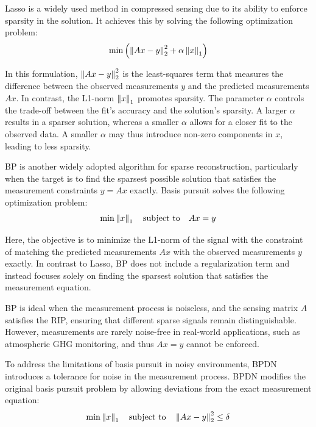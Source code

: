 \gls{Lasso} is a widely used method in compressed sensing due to its ability to enforce sparsity in the solution.
It achieves this by solving the following optimization problem:
\begin{equation}
    \min{\left( \left\lVert Ax -y \right\rVert_2^2 + \alpha\left\lVert x\right\rVert_1 \right)}
\end{equation}

In this formulation, $\left\lVert Ax -y \right\rVert_2^2$ is the least-squares term that measures the difference between the observed measurements $y$ and the predicted measurements $Ax$.
In contrast, the L1-norm $\left\lVert x\right\rVert_1$ promotes sparsity.
The parameter $\alpha$ controls the trade-off between the fit's accuracy and the solution's sparsity.
A larger $\alpha$ results in a sparser solution, whereas a smaller $\alpha$ allows for a closer fit to the observed data.
A smaller $\alpha$ may thus introduce non-zero components in $x$, leading to less sparsity.

\gls{BP} is another widely adopted algorithm for sparse reconstruction, particularly when the target is to find the sparsest possible solution that satisfies the measurement constraints $y = Ax$ exactly.
Basis pursuit solves the following optimization problem:
\begin{equation}
    \min \left\lVert x\right\rVert_1 \quad \text{subject to} \quad  Ax = y
\end{equation}

Here, the objective is to minimize the L1-norm of the signal with the constraint of matching the predicted measurements $A x$ with the observed measurements $y$ exactly.
In contrast to \gls{Lasso}, \gls{BP} does not include a regularization term and instead focuses solely on finding the sparsest solution that satisfies the measurement equation.

\gls{BP} is ideal when the measurement process is noiseless, and the sensing matrix $A$ satisfies the \gls{RIP}, ensuring that different sparse signals remain distinguishable.
However, measurements are rarely noise-free in real-world applications, such as atmospheric \gls{GHG} monitoring, and thus $Ax = y$ cannot be enforced.

To address the limitations of basis pursuit in noisy environments, \gls{BPDN} introduces a tolerance for noise in the measurement process.
\gls{BPDN} modifies the original basis pursuit problem by allowing deviations from the exact measurement equation:
\begin{equation}
    \min \left\lVert x\right\rVert_1 \quad \text{subject to} \quad  \left\lVert Ax -y\right\rVert_2^2 \le \delta
\end{equation}

